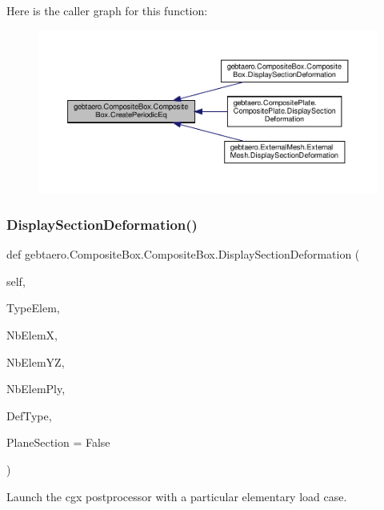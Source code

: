 Here is the caller graph for this function\+:\nopagebreak
\begin{figure}[H]
\begin{center}
\leavevmode
\includegraphics[width=350pt]{classgebtaero_1_1_composite_box_1_1_composite_box_a9328777b54ead0767f0075fe599b09d9_icgraph}
\end{center}
\end{figure}
\mbox{\label{classgebtaero_1_1_composite_box_1_1_composite_box_a024d2118868a02e7e6218300435148e0}} 
\subsubsection{\texorpdfstring{Display\+Section\+Deformation()}{DisplaySectionDeformation()}}
{\footnotesize\ttfamily def gebtaero.\+Composite\+Box.\+Composite\+Box.\+Display\+Section\+Deformation (\begin{DoxyParamCaption}\item[{}]{self,  }\item[{}]{Type\+Elem,  }\item[{}]{Nb\+ElemX,  }\item[{}]{Nb\+Elem\+YZ,  }\item[{}]{Nb\+Elem\+Ply,  }\item[{}]{Def\+Type,  }\item[{}]{Plane\+Section = {\ttfamily False} }\end{DoxyParamCaption})}



Launch the cgx postprocessor with a particular elementary load case. 


